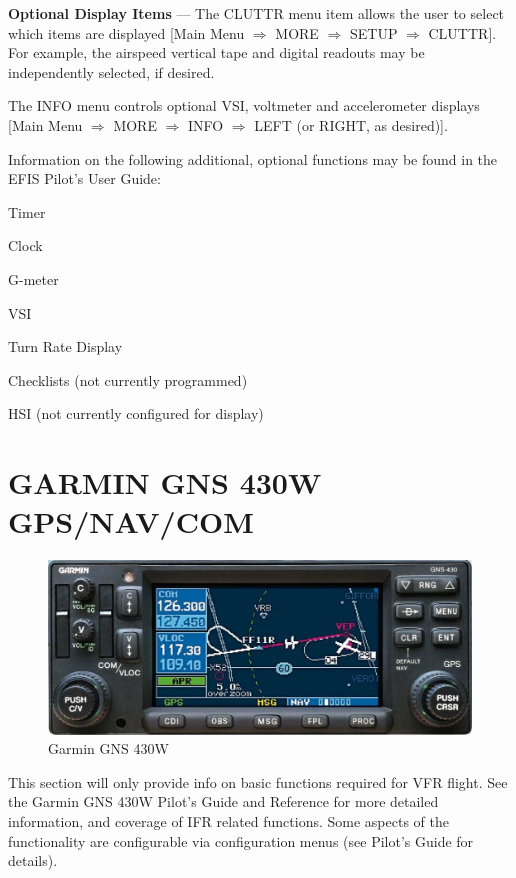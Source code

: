 \textbf{Optional Display Items} --- The CLUTTR menu item allows the user to select which items are displayed {[}Main Menu $\Rightarrow$ MORE $\Rightarrow$ SETUP $\Rightarrow$ CLUTTR{]}. For example, the airspeed vertical tape and digital readouts may be independently selected, if desired. 

The INFO menu controls optional VSI, voltmeter and accelerometer displays {[}Main Menu $\Rightarrow$ MORE $\Rightarrow$ INFO $\Rightarrow$ LEFT (or RIGHT, as desired){]}.

Information on the following additional, optional functions may be found in the EFIS Pilot's User Guide:

\begin{itemize*}
\item Timer 
\item Clock 
\item G-meter 
\item VSI 
\item Turn Rate Display 
\item Checklists (not currently programmed)
\item HSI (not currently configured for display)
\end{itemize*}

\section{GARMIN GNS 430W GPS/NAV/COM} 
\begin{figure}
[htb] 
\begin{center}
\includegraphics[scale=0.8]{../Diagrams/gns430_1}
\end{center}
\caption{Garmin GNS 430W} 
\end{figure}

This section will only provide info on basic functions required for VFR flight. See the Garmin GNS 430W Pilot's Guide and Reference for more detailed information, and coverage of IFR related functions. Some aspects of the functionality are configurable via configuration menus (see Pilot's Guide for details).

